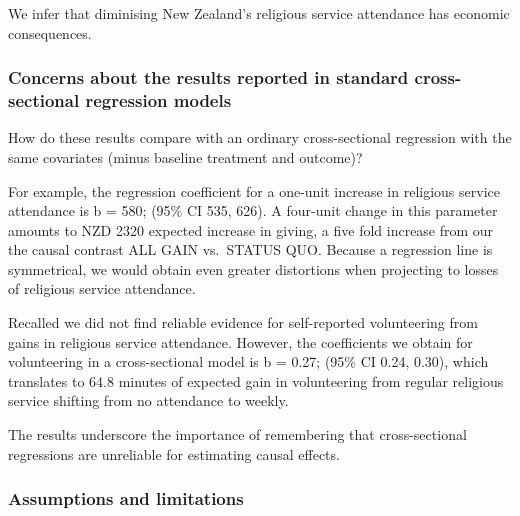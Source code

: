 \documentclass[
  singlecolumn]{article}
\begin{document}
We infer that diminising New Zealand's religious service attendance has
economic consequences.

\subsubsection{Concerns about the results reported in standard
cross-sectional regression
models}\label{concerns-about-the-results-reported-in-standard-cross-sectional-regression-models}

How do these results compare with an ordinary cross-sectional regression
with the same covariates (minus baseline treatment and outcome)?

For example, the regression coefficient for a one-unit increase in
religious service attendance is b = 580; (95\% CI 535, 626). A four-unit
change in this parameter amounts to NZD 2320 expected increase in
giving, a five fold increase from our the causal contrast ALL GAIN
vs.~STATUS QUO. Because a regression line is symmetrical, we would
obtain even greater distortions when projecting to losses of religious
service attendance.

Recalled we did not find reliable evidence for self-reported
volunteering from gains in religious service attendance. However, the
coefficients we obtain for volunteering in a cross-sectional model is b
= 0.27; (95\% CI 0.24, 0.30), which translates to 64.8 minutes of
expected gain in volunteering from regular religious service shifting
from no attendance to weekly.

The results underscore the importance of remembering that
cross-sectional regressions are unreliable for estimating causal
effects.

\subsubsection{Assumptions and
limitations}\label{assumptions-and-limitations}
\end{document}

